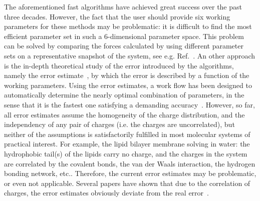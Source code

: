 \documentclass[journal=jacsat,manuscript=article]{achemso}
\newcommand{\recheck}[1]{{\color{black} #1}}
\begin{document}
The aforementioned fast algorithms have achieved great success
over the past three decades.
However, the fact that the user should provide six working parameters
for these methods may be problematic: it is difficult to find the
most efficient parameter set in such a 6-dimensional parameter space.
\recheck{
  This problem can be solved by comparing
  the forces calculated by
  using different parameter sets
  on a representative snapshot of the system,
  see e.g. Ref.~\cite{abraham2011optimization}.}
\recheck{An other approach is the 
  in-depth theoretical study}
of the error introduced by the algorithms, namely the
error estimate~\cite{kolafa1992cutoff, hummer1995numerical,
  petersen1995accuracy, deserno1998mue2, stern2008mesh,
  wang2010optimizing, neelov2010interlaced, ballenegger2012convert},
by which the error is described by a function of the working
parameters.  Using the error estimates, a work flow has been designed to
automatically determine the nearly optimal combination of parameters,
in the sense that it is the fastest one satisfying a demanding
accuracy~\cite{wang2010optimizing}. However, so far, all error
estimates assume the homogeneity of the charge distribution, and the
independency of any pair of charges (i.e. the charges are
uncorrelated), but neither of the assumptions is satisfactorily
fulfilled in most molecular
systems of practical interest.  For example, the lipid bilayer membrane
solving in water: the hydrophobic tail(s) of the lipids carry no charge, and
the charges in the system
are correlated by the covalent bonds, the van der Waals
interaction, the hydrogen bonding network, etc..  Therefore, the current
error estimates may be problematic, or even not applicable.  Several
papers have shown that due to the correlation of charges, the error estimates
obviously deviate from the real
error~\cite{deserno1998mue2,wang2010optimizing,ballenegger2012convert}.
\end{document}
